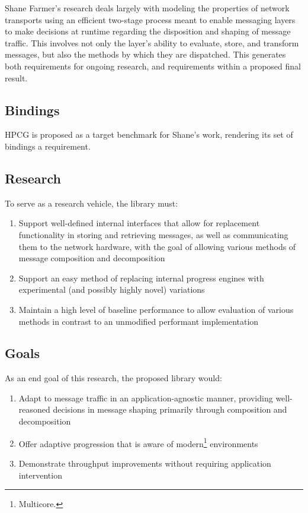 \documentclass{article}
\begin{document}
Shane Farmer's research deals largely with modeling the properties of network transports using an efficient two-stage process meant to enable messaging layers to make decisions at runtime regarding the disposition and shaping of message traffic.  This involves not only the layer's ability to evaluate, store, and transform messages, but also the methods by which they are dispatched.  This generates both requirements for ongoing research, and requirements within a proposed final result.

\subsection{Bindings}  

HPCG is proposed as a target benchmark for Shane's work, rendering its set of bindings a requirement.

\subsection{Research} 

To serve as a research vehicle, the library must:

\begin{enumerate}
\item Support well-defined internal interfaces that allow for replacement functionality in storing and retrieving messages, as well as communicating them to the network hardware, with the goal of allowing various methods of message composition and decomposition
\item Support an easy method of replacing internal progress engines with experimental (and possibly highly novel) variations
\item Maintain a high level of baseline performance to allow evaluation of various methods in contrast to an unmodified performant implementation
\end{enumerate}

\subsection{Goals} 

As an end goal of this research, the proposed library would:

\begin{enumerate}
\item Adapt to message traffic in an application-agnostic manner, providing well-reasoned decisions in message shaping primarily through composition and decomposition
\item Offer adaptive progression that is aware of modern\footnote{Multicore.} environments
\item Demonstrate throughput improvements without requiring application intervention
\end{enumerate}
\end{document}
